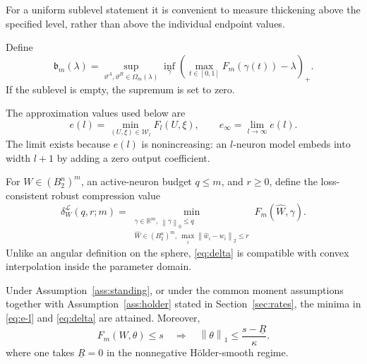 \documentclass[smallextended,envcountsect]{svjour3}
\newcommand{\R}{\mathbb{R}}
\newcommand{\norm}[1]{\left\lVert #1 \right\rVert}
\newcommand{\SubBar}{\mathfrak b}
\begin{document}
For a uniform sublevel statement it is convenient to measure thickening above the specified level, rather than above the individual endpoint values.

\begin{definition}\label{def:thickening}
Define
\begin{equation}
\SubBar_m(\lambda)
=\sup_{\vartheta^A,\vartheta^B\in\Omega_m(\lambda)}
\inf_{\gamma}
\left(\max_{t\in[0,1]}F_m(\gamma(t))-\lambda\right)_+.
\label{eq:thickening}
\end{equation}
If the sublevel is empty, the supremum is set to zero.
\end{definition}

The approximation values used below are
\begin{equation}
e(l)
=\min_{(U,\xi)\in\mathcal W_l}F_l(U,\xi),
\qquad
e_\infty=\lim_{l\to\infty}e(l).
\label{eq:e-l}
\end{equation}
The limit exists because $e(l)$ is nonincreasing: an $l$-neuron model embeds into width $l+1$ by adding a zero output coefficient.

For $W\in(B_2^n)^m$, an active-neuron budget $q\le m$, and $r\ge0$, define the loss-consistent robust compression value
\begin{equation}
\delta_W^{\mathcal L}(q,r;m)
=\min_{\substack{\gamma\in\R^m,\ \norm{\gamma}_0\le q\\
\widehat W\in(B_2^n)^m,\ \max_i\norm{\hat w_i-w_i}_2\le r}}
F_m(\widehat W,\gamma).
\label{eq:delta}
\end{equation}
Unlike an angular definition on the sphere, \eqref{eq:delta} is compatible with convex interpolation inside the parameter domain.

\begin{lemma}\label{lem:attainment}
Under Assumption~\ref{ass:standing}, or under the common moment assumptions together with Assumption~\ref{ass:holder} stated in Section~\ref{sec:rates}, the minima in \eqref{eq:e-l} and \eqref{eq:delta} are attained. Moreover,
\begin{equation}
F_m(W,\theta)\le s
\quad\Longrightarrow\quad
\norm{\theta}_1\le\frac{s-\underline R}{\kappa}.
\label{eq:l1-control}
\end{equation}
where one takes $\underline R=0$ in the nonnegative H\"older-smooth regime.
\end{lemma}
\end{document}
